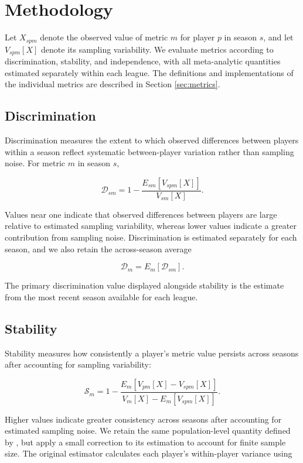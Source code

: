 \documentclass[10pt]{article}
\begin{document}
\section{Methodology}

Let $X_{spm}$ denote the observed value of metric $m$ for player $p$ in season $s$, and let $V_{spm}[X]$ denote its sampling variability.
We evaluate metrics according to discrimination, stability, and independence, with all meta-analytic quantities estimated separately within each league.
The definitions and implementations of the individual metrics are described in Section \ref{sec:metrics}.


\subsection{Discrimination}

Discrimination measures the extent to which observed differences between players within a season reflect systematic between-player variation rather than sampling noise.
For metric $m$ in season $s$,

\[
\mathcal{D}_{sm}
=
1-
\frac{
E_{sm}\left[V_{spm}[X]\right]
}{
V_{sm}[X]
}.
\]

Values near one indicate that observed differences between players are large relative to estimated sampling variability, whereas lower values indicate a greater contribution from sampling noise.
Discrimination is estimated separately for each season, and we also retain the across-season average

\[
\mathcal{D}_{m}
=
E_m[\mathcal{D}_{sm}].
\]

The primary discrimination value displayed alongside stability is the estimate from the most recent season available for each league.


\subsection{Stability}

Stability measures how consistently a player's metric value persists across seasons after accounting for sampling variability:

\[
\mathcal{S}_{m}
=
1-
\frac{
E_m\left[V_{pm}[X]-V_{spm}[X]\right]
}{
V_m[X]-E_m\left[V_{spm}[X]\right]
}.
\]

Higher values indicate greater consistency across seasons after accounting for estimated sampling noise.
We retain the same population-level quantity defined by \citet{franks_meta-analytics_2016}, but apply a small correction to its estimation to account for finite sample size.
The original estimator calculates each player's within-player variance using
\end{document}
